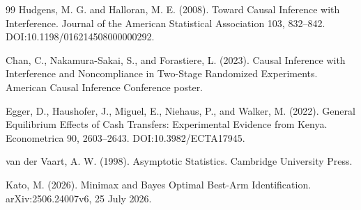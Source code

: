 \documentclass{article}
\begin{document}
\begin{thebibliography}{99}
   Hudgens, M. G. and Halloran, M. E. (2008). Toward Causal Inference with Interference. Journal of the American Statistical Association 103, 832--842. DOI:10.1198/016214508000000292.

   Chan, C., Nakamura-Sakai, S., and Forastiere, L. (2023). Causal Inference with Interference and Noncompliance in Two-Stage Randomized Experiments. American Causal Inference Conference poster.

   Egger, D., Haushofer, J., Miguel, E., Niehaus, P., and Walker, M. (2022). General Equilibrium Effects of Cash Transfers: Experimental Evidence from Kenya. Econometrica 90, 2603--2643. DOI:10.3982/ECTA17945.

   van der Vaart, A. W. (1998). Asymptotic Statistics. Cambridge University Press.

   Kato, M. (2026). Minimax and Bayes Optimal Best-Arm Identification. arXiv:2506.24007v6, 25 July 2026.

\end{thebibliography}
\end{document}
